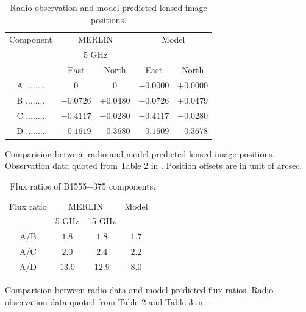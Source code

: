 \documentclass[usenatbib]{mn2e}
\begin{document}
\begin{table}
  \caption{Radio observation and model-predicted lensed image positions.}
  \begin{tabular}{@{}ccccc}

\hline

Component	&\multicolumn{2}{c}{MERLIN}		 & \multicolumn{2}{c}{Model} \\
					&\multicolumn{2}{c}{5 GHz}		&			\\
					 &East &North &East 		&North\\ 
\hline
A ........ &$0$    		&$0$		&$-0.0000$ &$+0.0000$   \\  
B ........ &$-0.0726$ 	&$+0.0480$	&$-0.0726$ &$+0.0479$   \\  
C ........ &$-0.4117$  &$-0.0280$	&$-0.4117$ &$-0.0280$   \\  
D ........ &$-0.1619$  &$-0.3680$	&$-0.1609$ &$-0.3678$   \\  
\hline
\end{tabular}

\medskip
Comparision between radio and model-predicted lensed image positions. Observation data quoted from Table 2 in \citet{Marlow}. Position offsets are in unit of arcsec.

\end{table}

\begin{table}
  \caption{Flux ratios of B1555+375 components.}
  \begin{tabular}{@{}ccccc}

\hline
Flux ratio	& \multicolumn{2}{c}{MERLIN} & Model\\
		&5 GHz & 15 GHz  &\\
\hline
A/B			&$1.8$ & $1.8$ & $1.7$  \\ 
A/C 		&$2.0$ 	&$2.4$ &$2.2$  \\
A/D			&$13.0$ &$ 12.9$ & $8.0$  \\

\hline
\end{tabular}

\medskip
Comparision between radio data and model-predicted flux ratios. Radio observation data quoted from Table 2 and Table 3 in \citet{Marlow}.

\end{table}
\end{document}

